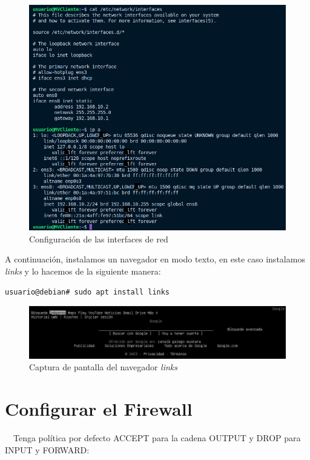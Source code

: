 \documentclass{report}
\begin{document}
  \begin{figure}[H]
    \centering
    \includegraphics[scale=0.65]{img/configuracion_interfaces_cliente.png}
    \caption{Configuración de las interfaces de red}
    \label{fig:configuracion_interfaces_cliente}
  \end{figure}

  A continuación, instalamos un navegador en modo texto, en este caso instalamos \emph{links} y lo hacemos de la siguiente manera:

  \begin{verbatim}
usuario@debian# sudo apt install links
  \end{verbatim}

  \begin{figure}[H]
    \centering
    \includegraphics[scale=0.65]{img/links_google.png}
    \caption{Captura de pantalla del navegador \emph{links}}
    \label{fig:links}
  \end{figure}

  \chapter{Configurar el Firewall}
  \CIRCLE \ \ Tenga política por defecto ACCEPT para la cadena OUTPUT y DROP para INPUT y FORWARD:
  
\end{document}
